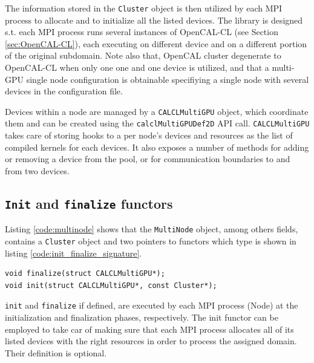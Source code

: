 The information stored in the \texttt{Cluster} object is then utilized by each MPI process to allocate and to initialize all the listed devices.
The library is designed s.t. each MPI process runs several instances of  OpenCAL-CL (see Section \ref{sec:OpenCAL-CL}), each executing on different device and on a different portion of the original subdomain.
Note also that, OpenCAL cluster degenerate to OpenCAL-CL when only one one and one device is utilized, and that a multi-GPU single node configuration is obtainable specifiying a single node with several devices in the configuration file.

Devices within a node are managed by a \texttt{CALCLMultiGPU} object,  which  coordinate them and can be created using the \texttt{calclMultiGPUDef2D} API call. \texttt{CALCLMultiGPU} takes care of storing hooks to a per node's devices and resources as the list of compiled kernels for each devices.
It also exposes a number of methods for adding or removing a device from the pool, or for communication boundaries to and from two devices.


\subsection{\texttt{Init} and \texttt{finalize} functors}
Listing \ref{code:multinode} shows that the \texttt{MultiNode} object, among others fields, contains a \texttt{Cluster} object and two pointers to functors which type is shown in listing \ref{code:init_finalize_signature}.
\begin{lstlisting}
void finalize(struct CALCLMultiGPU*);
void init(struct CALCLMultiGPU*, const Cluster*);
\end{lstlisting}

\texttt{init} and \texttt{finalize} if defined, are executed by each MPI process (Node) at the initialization and finalization phases, respectively.
The init functor can be employed to take car of making sure that each MPI process allocates all of its listed devices with the right resources in order to process the assigned domain. Their definition is optional.

